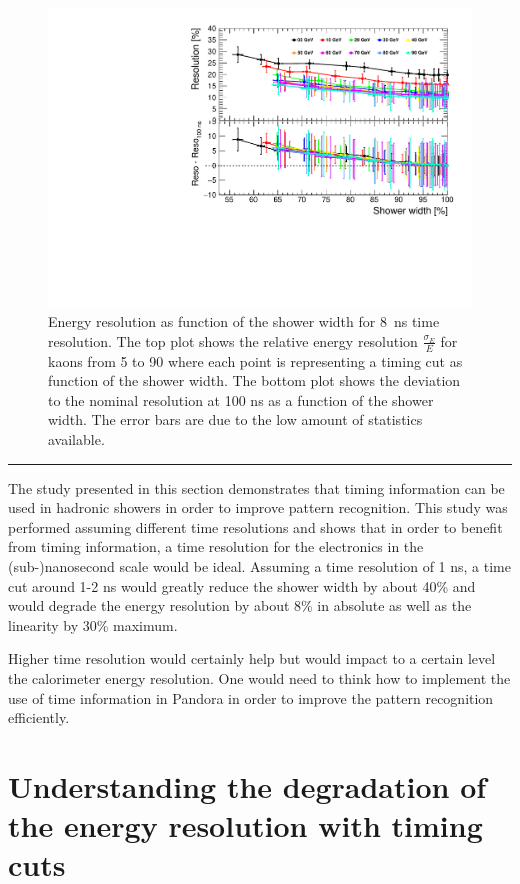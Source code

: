\begin{figure}[htbp!]
  \centering
  \includegraphics[width=0.7\linewidth]{../Thesis_Plots/ILD/Smearing_8ns/Plots/ShowerWidth_Resolution_Smearing3}
  \caption{Energy resolution as function of the shower width for \SI{8}{\nano\second} time resolution. The top plot shows the relative energy resolution $\frac{\sigma_{E}}{E}$ for kaons from 5 to 90 \GeV where each point is representing a timing cut as function of the shower width. The bottom plot shows the deviation to the nominal resolution at 100 ns as a function of the shower width. The error bars are due to the low amount of statistics available.}  \label{fig:WidthReso8ns}
\end{figure}

\begin{center}
  \rule{0.5\textwidth}{.4pt}
\end{center}

The study presented in this section demonstrates that timing information can be used in hadronic showers in order to improve pattern recognition. This study was performed assuming different time resolutions and shows that in order to benefit from timing information, a time resolution for the electronics in the (sub-)nanosecond scale would be ideal. Assuming a time resolution of 1 ns, a time cut around 1-2 ns would greatly reduce the shower width by about 40\% and would degrade the energy resolution by about 8\% in absolute as well as the linearity by 30\% maximum.

Higher time resolution would certainly help but would impact to a certain level the calorimeter energy resolution. One would need to think how to implement the use of time information in Pandora in order to improve the pattern recognition efficiently.

\section{Understanding the degradation of the energy resolution with timing cuts}
\label{sec:eresdegrad}

